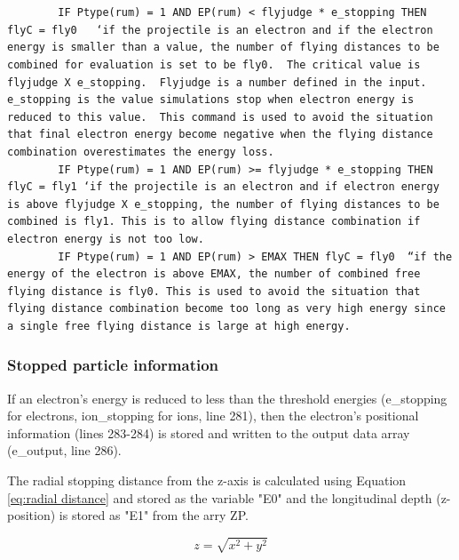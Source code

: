 \documentclass[10pt, reqno]{exam}
\begin{document}
\begin{verbatim}

    
        IF Ptype(rum) = 1 AND EP(rum) < flyjudge * e_stopping THEN flyC = fly0   ‘if the projectile is an electron and if the electron energy is smaller than a value, the number of flying distances to be combined for evaluation is set to be fly0.  The critical value is flyjudge X e_stopping.  Flyjudge is a number defined in the input. e_stopping is the value simulations stop when electron energy is reduced to this value.  This command is used to avoid the situation that final electron energy become negative when the flying distance combination overestimates the energy loss. 
        IF Ptype(rum) = 1 AND EP(rum) >= flyjudge * e_stopping THEN flyC = fly1 ‘if the projectile is an electron and if electron energy is above flyjudge X e_stopping, the number of flying distances to be combined is fly1. This is to allow flying distance combination if electron energy is not too low.
        IF Ptype(rum) = 1 AND EP(rum) > EMAX THEN flyC = fly0  “if the energy of the electron is above EMAX, the number of combined free flying distance is fly0. This is used to avoid the situation that flying distance combination become too long as very high energy since a single free flying distance is large at high energy. 
\end{verbatim}

\clearpage

\subsubsection{Stopped particle information}
\label{sec:stopped particle}
If an electron's energy is reduced to less than the threshold energies (e\_stopping for electrons, ion\_stopping for ions, line 281), then the electron's positional information (lines 283-284) is stored and written to the output data array (e\_output, line 286). \par

The radial stopping distance from the z-axis is calculated using Equation \ref{eq:radial distance} and stored as the variable "E0" and the longitudinal depth (z-position) is stored as "E1" from the arry ZP. \par

\begin{equation}
    z = \sqrt{x^2 + y^2} 
    \label{eq:radial distance}
\end{equation}
\end{document}
